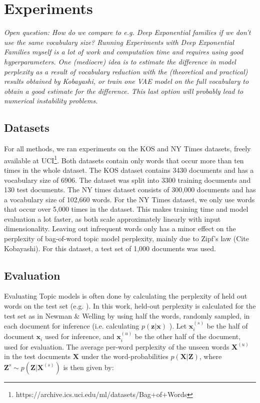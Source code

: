 \documentclass{report}
\begin{document}
\chapter{Experiments}
	\textit{Open question: How do we compare to e.g. Deep Exponential families if we don't use the same vocabulary size? Running Experiments with Deep Exponential Families myself is a lot of work and computation time and requires using good hyperparameters. One (mediocre) idea is to estimate the difference in model perplexity as a result of vocabulary reduction with the (theoretical and practical) results obtained by Kobayashi, or train one VAE model on the full vocabulary to obtain a good estimate for the difference. This last option will probably lead to numerical instability problems.}
	\section{Datasets}
	For all methods, we ran experiments on the KOS and NY Times datasets, freely available at UCI\footnote{https://archive.ics.uci.edu/ml/datasets/Bag+of+Words}. Both datasets contain only words that occur more than ten times in the whole dataset. The KOS dataset contains 3430 documents and has a vocabulary size of 6906. The dataset was split into 3300 training documents and 130 test documents. The NY times dataset consists of 300,000 documents and has a vocabulary size of 102,660 words. For the NY Times dataset, we only use words that occur over 5,000 times in the dataset. This makes training time and model evaluation a lot faster, as both scale approximately linearly with input dimensionality. Leaving out infrequent words only has a minor effect on the perplexity of bag-of-word topic model perplexity, mainly due to Zipf's law (Cite Kobayashi). For this dataset, a test set of 1,000 documents was used.
	\\
	\section{Evaluation}
	
	Evaluating Topic models is often done by calculating the perplexity of held out words on the test set (e.g. \cite{blei2003latent, newman2007distributed, ranganath2015deep}). In this work, held-out perplexity is calculated for the test set as in Newman \& Welling \cite{newman2007distributed} by using half the words, randomly sampled, in each document for inference (i.e. calculating $p(\mathbf{z}|\mathbf{x})$ ). Let $\mathbf{x}_{i}^{(s)}$ be the half of document $\mathbf{x}_i$ used for inference, and $\mathbf{x}_{i}^{(u)}$ be the other half of the document, used for evaluation. The average per-word perplexity of the unseen words $\mathbf{X}^{(u)}$ in the test documents $\mathbf{X}$ under the word-probabilities $p(\mathbf{X}|\mathbf{Z})$, where $\mathbf{Z}^s \sim p(\mathbf{Z}|\mathbf{X}^{(s)})$ is then given by:
	
\end{document}
